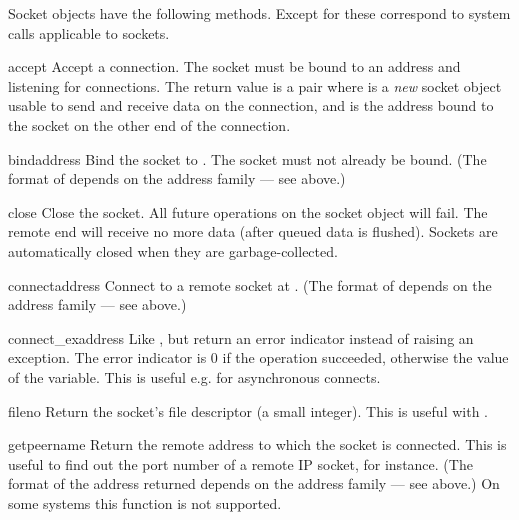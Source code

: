 \noindent
Socket objects have the following methods.  Except for
 these correspond to \UNIX{} system calls applicable to
sockets.

\renewcommand{\indexsubitem}{(socket method)}
\begin{funcdesc}{accept}{}
Accept a connection.
The socket must be bound to an address and listening for connections.
The return value is a pair 
where  is a \emph{new} socket object usable to send and
receive data on the connection, and  is the address bound
to the socket on the other end of the connection.
\end{funcdesc}

\begin{funcdesc}{bind}{address}
Bind the socket to .  The socket must not already be bound.
(The format of  depends on the address family --- see above.)
\end{funcdesc}

\begin{funcdesc}{close}{}
Close the socket.  All future operations on the socket object will fail.
The remote end will receive no more data (after queued data is flushed).
Sockets are automatically closed when they are garbage-collected.
\end{funcdesc}

\begin{funcdesc}{connect}{address}
Connect to a remote socket at .
(The format of  depends on the address family --- see above.)
\end{funcdesc}

\begin{funcdesc}{connect_ex}{address}
Like , but return an error indicator
instead of raising an exception.  The error indicator is 0 if the
operation succeeded, otherwise the value of the 
variable.  This is useful e.g. for asynchronous connects.
\end{funcdesc}

\begin{funcdesc}{fileno}{}
Return the socket's file descriptor (a small integer).  This is useful
with .
\end{funcdesc}

\begin{funcdesc}{getpeername}{}
Return the remote address to which the socket is connected.  This is
useful to find out the port number of a remote IP socket, for instance.
(The format of the address returned depends on the address family ---
see above.)  On some systems this function is not supported.
\end{funcdesc}

